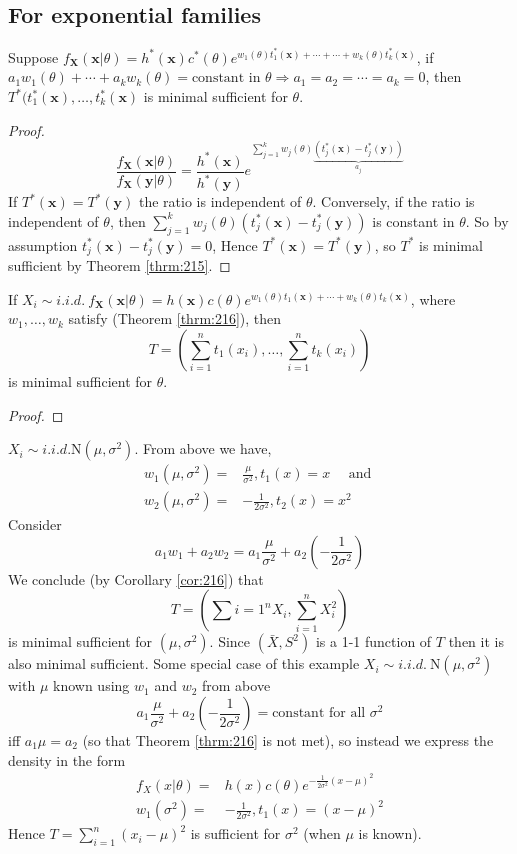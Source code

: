 \documentclass[english, 11pt]{article}
\begin{document}
\subsection{For exponential families}
\begin{thrm}\label{thrm:216}
Suppose $f_{\bm{X}}(\bm{x}|\theta)=h^*(\bm{x})c^*(\theta)e^{w_1(\theta)t_1^*(\bm{x})+\cdots+\cdots+w_k(\theta)t_k^*(\bm{x})}$, if $a_1w_1(\theta)+\cdots+a_kw_k(\theta)=\text{constant in }\theta\Rightarrow a_1=a_2=\cdots=a_k=0$, then $T^*(t_1^*(\bm{x}),\dots, t_k^*(\bm{x})$ is minimal sufficient for $\theta$.
\end{thrm}
\begin{proof}
$$
\frac{f_{\bm{X}}(\bm{x}|\theta)}{f_{\bm{X}}(\bm{y}|\theta)}=\frac{h^*(\bm{x})}{h^*(\bm{y})}e^{\sum_{j=1}^kw_j(\theta)\underbrace{(t^*_j(\bm{x})-t_j^*(\bm{y}))}_{a_j}}
$$
If $T^*(\bm{x})=T^*(\bm{y})$ the ratio is independent of $\theta$. Conversely, if the ratio is independent of $\theta$, then $\sum_{j=1}^kw_j(\theta)(t^*_j(\bm{x})-t_j^*(\bm{y}))$ is constant in $\theta$. So by assumption $t^*_j(\bm{x})-t_j^*(\bm{y})=0$, Hence $T^*(\bm{x})=T^*(\bm{y})$, so $T^*$ is  minimal sufficient by Theorem \ref{thrm:215}.
\end{proof}

\begin{cor}\label{cor:216}
If $X_i\sim i.i.d. ~f_{\bm{X}}(\bm{x}|\theta)=h(\bm{x})c(\theta)e^{w_1(\theta)t_1(\bm{x})+\cdots+w_k(\theta)t_k(\bm{x})}$, where $w_1, \dots, w_k$ satisfy (Theorem \ref{thrm:216}), then
$$
T=\left(\sum_{i=1}^nt_1(x_i), \dots, \sum_{i=1}^nt_k(x_i)\right)
$$
is minimal sufficient for $\theta$.
\end{cor}
\begin{proof}
\end{proof}

\begin{exmp}
$X_i\sim i.i.d. \text{N}(\mu, \sigma^2)$. From above we have, 
$$
\begin{aligned}
w_1(\mu, \sigma^2)=&\frac{\mu}{\sigma^2}, t_1(x)=x\quad\text{ and }\\
w_2(\mu, \sigma^2)=&-\frac{1}{2\sigma^2}, t_2(x)=x^2
\end{aligned}
$$
Consider 
$$
a_1w_1+a_2w_2=a_1\frac{\mu}{\sigma^2}+a_2\left(-\frac{1}{2\sigma^2}\right)
$$
We conclude (by Corollary \ref{cor:216}) that
$$
T=\left(\sum{i=1}^nX_i, \sum_{i=1}^nX_i^2\right)
$$
is minimal sufficient for $(\mu, \sigma^2)$. Since $(\bar{X}, S^2)$ is a 1-1 function of $T$ then it is also minimal sufficient. Some special case of this example $X_i\sim i.i.d.~\text{N}(\mu, \sigma^2)$ with $\mu$ known using $w_1$ and $w_2$ from above 
$$
a_1\frac{\mu}{\sigma^2}+a_2\left(-\frac{1}{2\sigma^2}\right)=\text{constant for all }\sigma^2
$$
iff $a_1\mu=a_2$ (so that Theorem \ref{thrm:216} is not met), so instead we express the density in the form
$$
\begin{aligned}
f_{X}(x|\theta)=&h(x)c(\theta)e^{-\frac{1}{2\sigma^2}(x-\mu)^2}\\
w_1(\sigma^2)=&-\frac{1}{2\sigma^2}, t_1(x)=(x-\mu)^2
\end{aligned}
$$
Hence $T=\sum_{i=1}^n(x_i-\mu)^2$ is sufficient for $\sigma^2$ (when $\mu$ is known).
\end{exmp}
\end{document}
